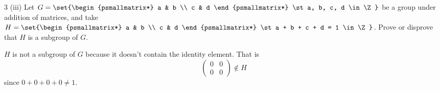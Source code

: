 \documentclass[11pt]{penrose}
\begin{document}
\begin{problem}{3 (iii)}
    Let $G = \set{\begin{psmallmatrix*} a & b \\ c & d \end{psmallmatrix*} \st a, b, c, d \in \Z}$ be a group under addition of matrices, and take $H = \set{\begin{psmallmatrix*} a & b \\ c & d \end{psmallmatrix*} \st a + b + c + d = 1 \in \Z}$. Prove or disprove that $H$ is a subgroup of $G$.

    \solution $H$ is not a subgroup of $G$ because it doesn't contain the identity element. That is
    \begin{equation*}
        \begin{pmatrix*} 0 & 0 \\ 0 & 0 \end{pmatrix*} \notin H
    \end{equation*}
    since $0 + 0 + 0 + 0  \neq 1$.
\end{problem}
\end{document}
